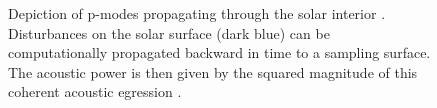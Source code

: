 \documentclass[11pt,a4paper,onecolumn]{report}
\begin{document}
\begin{figure}[t]%
  \centering
  \qquad
  \caption[]{ Depiction of p-modes propagating through the solar
    interior \citep{Lindsey2017}.  Disturbances on the solar surface (dark blue) can be
    computationally propagated backward in time to a sampling surface. The
    acoustic power is then given by the squared magnitude of this coherent
    acoustic egression \citep{Lindsey2011}.}
\end{figure}
\end{document}

